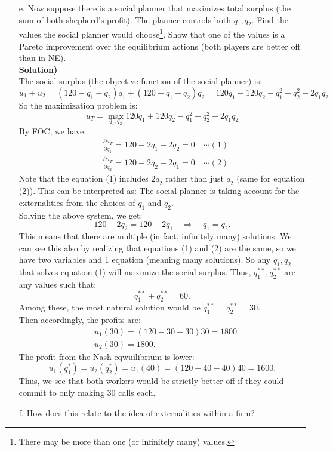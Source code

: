 \documentclass{article}
\begin{document}
\begin{enumerate}
        \item[e.] Now suppose there is a social planner that maximizes total surplus (the sum of both shepherd's profit). The planner controls both $q_1, q_2$. Find the values the social planner would choose\footnote{There may be more than one (or infinitely many) values.}. Show that one of the values is a Pareto improvement over the equilibrium actions (both players are better off than in NE).\\
        \textbf{Solution)}\\
        The social surplus (the objective function of the social planner) is:
        $$
        u_1+u_2=(120-q_1-q_2)q_1+(120-q_1-q_2)q_2=120q_1+120q_2-q_1^2-q_2^2-2q_1q_2
        $$
        So the maximization problem is:
        $$
        u_T=\max_{q_1,q_2}120q_1+120q_2-q_1^2-q_2^2-2q_1q_2
        $$
        By FOC, we have:
        \begin{align*}
            &\frac{\partial u_T}{\partial q_1}=120-2q_1-2q_2=0\quad\cdots(1)\\
            &\frac{\partial u_T}{\partial q_2}=120-2q_2-2q_1=0\quad\cdots(2)
        \end{align*}
        Note that the equation (1) includes $2q_2$ rather than just $q_2$ (same for equation (2)). This can be interpreted as: The social planner is taking account for the externalities from the choices of $q_1$ and $q_2$.\\
        Solving the above system, we get:
        $$
        120-2q_2=120-2q_1\quad\Rightarrow\quad q_1=q_2.
        $$
        This means that there are multiple (in fact, infinitely many) solutions. We can see this also by realizing that equations (1) and (2) are the same, so we have two variables and 1 equation (meaning many solutions). So any $q_1,q_2$ that solves equation (1) will maximize the social surplus. Thus, $q_1^{**},q_2^{**}$ are any values such that:
        $$
        q_1^{**}+q_2^{**}=60.
        $$
        Among these, the most natural solution would be $q_1^{**}=q_2^{**}=30$.\\
        Then accordingly, the profits are:
        \begin{align*}
            &u_1(30)=(120-30-30)30=1800\\
            &u_2(30)=1800.
        \end{align*}
        The profit from the Nash eqwuilibrium is lower:
        $$
        u_1(q_1^*)=u_2(q_2^*)=u_1(40)=(120-40-40)40=1600.
        $$
        Thus, we see that both workers would be strictly better off if they could commit to only making 30 calls each.
        
        \item[f.] How does this relate to the idea of externalities within a firm?
        
        \end{enumerate}
\end{document}
